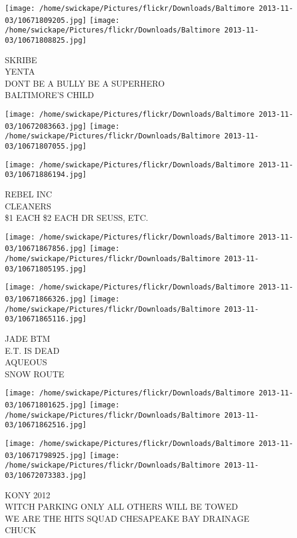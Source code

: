 \documentclass[10pt,letterpaper]{article}
\begin{document}
\texttt{[image: /home/swickape/Pictures/flickr/Downloads/Baltimore 2013-11-03/10671809205.jpg]}
\texttt{[image: /home/swickape/Pictures/flickr/Downloads/Baltimore 2013-11-03/10671808825.jpg]}

SKRIBE\\
YENTA\\
DONT BE A BULLY BE A SUPERHERO\\
BALTIMORE'S CHILD
\pagebreak

\texttt{[image: /home/swickape/Pictures/flickr/Downloads/Baltimore 2013-11-03/10672083663.jpg]}
\texttt{[image: /home/swickape/Pictures/flickr/Downloads/Baltimore 2013-11-03/10671807055.jpg]}

\vspace{0.25in}
\texttt{[image: /home/swickape/Pictures/flickr/Downloads/Baltimore 2013-11-03/10671886194.jpg]}

REBEL INC\\
CLEANERS\\
\$1 EACH \$2 EACH DR SEUSS, ETC.
\pagebreak

\texttt{[image: /home/swickape/Pictures/flickr/Downloads/Baltimore 2013-11-03/10671867856.jpg]}
\texttt{[image: /home/swickape/Pictures/flickr/Downloads/Baltimore 2013-11-03/10671805195.jpg]}

\texttt{[image: /home/swickape/Pictures/flickr/Downloads/Baltimore 2013-11-03/10671866326.jpg]}
\texttt{[image: /home/swickape/Pictures/flickr/Downloads/Baltimore 2013-11-03/10671865116.jpg]}

JADE BTM\\
E.T. IS DEAD\\
AQUEOUS\\
SNOW ROUTE
\pagebreak

\texttt{[image: /home/swickape/Pictures/flickr/Downloads/Baltimore 2013-11-03/10671801625.jpg]}
\texttt{[image: /home/swickape/Pictures/flickr/Downloads/Baltimore 2013-11-03/10671862516.jpg]}

\texttt{[image: /home/swickape/Pictures/flickr/Downloads/Baltimore 2013-11-03/10671798925.jpg]}
\texttt{[image: /home/swickape/Pictures/flickr/Downloads/Baltimore 2013-11-03/10672073383.jpg]}

KONY 2012\\
WITCH PARKING ONLY ALL OTHERS WILL BE TOWED\\
WE ARE THE HITS SQUAD CHESAPEAKE BAY DRAINAGE\\
CHUCK
\pagebreak
\end{document}
